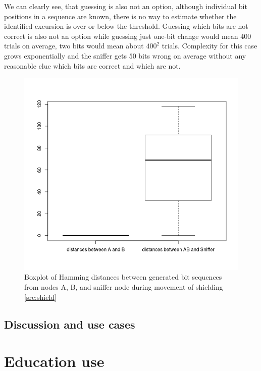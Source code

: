 \documentclass[
  print, %
  table,   %
  nolof,     %
  nolot,     %
           oneside
]{fithesis3}
\begin{document}
We can clearly see, that guessing is also not an option, although individual bit positions in a sequence are known, there is no way to estimate whether the identified excursion is over or below the threshold. Guessing which bits are not correct is also not an option while guessing just one-bit change would mean $400$ trials on average, two bits would mean about $400^2$ trials. Complexity for this case grows exponentially and the sniffer gets $50$ bits wrong on average without any reasonable clue which bits are correct and which are not.

  \begin{figure}
    \includegraphics[width=\textwidth]{../images/boxplotDistancesRottation.png}
  \caption{Boxplot of Hamming distances between generated bit sequences from nodes A, B, and sniffer node during movement of shielding \ref{src:shield}}
  \label{fig:errorsS}
  \end{figure}

  \section{Discussion and use cases}\label{sec:use}


\chapter{Education use}\label{ch:edu}
\end{document}
